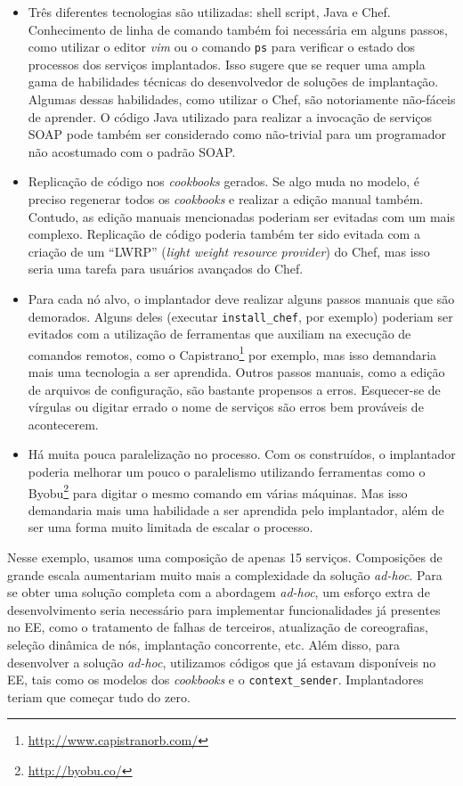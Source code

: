 \begin{itemize}

\item Três diferentes tecnologias são utilizadas:
shell script, Java e Chef.
Conhecimento de linha de comando também foi necessária em alguns passos,
como utilizar o editor \emph{vim} ou o comando \texttt{ps} para verificar
o estado dos processos dos serviços implantados.
Isso sugere que se requer uma ampla gama de habilidades técnicas
do desenvolvedor de soluções de implantação.
Algumas dessas habilidades, como utilizar o Chef,
são notoriamente não-fáceis de aprender.
O código Java utilizado para realizar a invocação de serviços SOAP
pode também ser considerado como não-trivial para um programador
não acostumado com o padrão SOAP.

\item Replicação de código nos \emph{cookbooks} gerados.
Se algo muda no modelo, é preciso regenerar todos os \emph{cookbooks}
e realizar a edição manual também.
Contudo, as edição manuais mencionadas
poderiam ser evitadas com um \script mais complexo.
Replicação de código poderia também ter sido evitada com a criação de um
``LWRP'' (\emph{light weight resource provider}) do Chef,
mas isso seria uma tarefa para usuários avançados do Chef.

\item Para cada nó alvo, o implantador deve realizar alguns passos manuais
que são demorados. Alguns deles (executar \texttt{install\_chef}, por exemplo)
poderiam ser evitados com a utilização de ferramentas
que auxiliam na execução de comandos remotos,
como o Capistrano\footnote{\url{http://www.capistranorb.com/}} por exemplo,
mas isso demandaria mais uma tecnologia a ser aprendida.
Outros passos manuais, como a edição de arquivos de configuração, 
são bastante propensos a erros.
Esquecer-se de vírgulas ou digitar errado o nome de serviços
são erros bem prováveis de acontecerem.

\item Há muita pouca paralelização no processo.
Com os \scripts construídos, o implantador poderia melhorar
um pouco o paralelismo utilizando ferramentas como o
Byobu\footnote{\url{http://byobu.co/}} 
para digitar o mesmo comando em várias máquinas.
Mas isso demandaria mais uma habilidade a ser aprendida pelo implantador,
além de ser uma forma muito limitada de escalar o processo.

\end{itemize}

Nesse exemplo, usamos uma composição de apenas 15 serviços.
Composições de grande escala aumentariam muito mais a complexidade da
solução \emph{ad-hoc}.
Para se obter uma solução completa com a abordagem \emph{ad-hoc},
um esforço extra de desenvolvimento seria necessário
para implementar funcionalidades já presentes no EE,
como o tratamento de falhas de terceiros,
atualização de coreografias, seleção dinâmica de nós,
implantação concorrente, etc.
Além disso, para desenvolver a solução \emph{ad-hoc},
utilizamos códigos que já estavam disponíveis no EE,
tais como os modelos dos \emph{cookbooks} e o \texttt{context\_sender}.
Implantadores teriam que começar tudo do zero.

